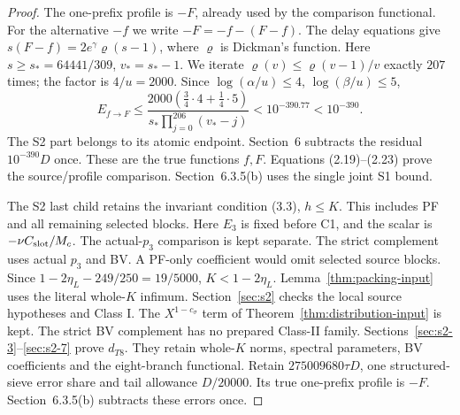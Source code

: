 \begin{proof}
The one-prefix profile is $-F$, already used by the comparison functional.
For the alternative $-f$ we write $-F=-f-(F-f)$.
The delay equations give $s(F-f)=2e^\gamma\varrho(s-1)$,
where $\varrho$ is Dickman's function.
Here $s\ge s_*=64441/309$, $v_*=s_*-1$.
We iterate $\varrho(v)\le\varrho(v-1)/v$ exactly $207$ times;
the factor is $4/u=2000$.
Since $\log(\alpha/u)\le4$, $\log(\beta/u)\le5$,
\[
 E_{f\to F}\le
 \frac{2000(\tfrac34\cdot4+\tfrac14\cdot5)}
 {s_*\prod_{j=0}^{206}(v_*-j)}<10^{-390.77}<10^{-390}.
 \tag{2.23}\label{p2:eq:2.23}
\]
The S2 part belongs to its atomic endpoint.
Section~6 subtracts the residual $10^{-390}D$ once.
These are the true functions $f,F$.
Equations (2.19)--(2.23) prove the source/profile comparison.
Section~6.3.5(b) uses the single joint S1 bound.

The S2 last child retains the invariant condition (3.3), $h\le K$.
This includes PF and all remaining selected blocks.
Here $E_3$ is fixed before C1, and the scalar is $-\nu C_{\rm slot}/M_c$.
The actual-$p_3$ comparison is kept separate.
The strict complement uses actual $p_3$ and BV.
A PF-only coefficient would omit selected source blocks.
Since $1-2\eta_L-249/250=19/5000$, $K<1-2\eta_L$.
Lemma~\ref{thm:packing-input} uses the literal whole-$K$ infimum.
Section~\ref{sec:s2} checks the local source hypotheses and Class I.
The $X^{1-c_\sigma}$ term of Theorem~\ref{thm:distribution-input} is kept.
The strict BV complement has no prepared Class-II family.
Sections~\ref{sec:s2-3}--\ref{sec:s2-7} prove $d_{T8}$.
They retain whole-$K$ norms, spectral parameters, BV coefficients and the eight-branch functional.
Retain $275009680\tau D$, one structured-sieve error share and tail allowance $D/20000$.
Its true one-prefix profile is $-F$.
Section~6.3.5(b) subtracts these errors once.
\end{proof}



